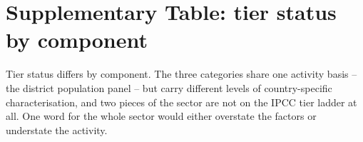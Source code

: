 \section{Supplementary Table: tier status by component}
\label{app:tiers}

Tier status differs by component. The three categories share one activity
basis -- the district population panel -- but carry different levels of
country-specific characterisation, and two pieces of the sector are not on
the IPCC tier ladder at all. One word for the whole sector would either
overstate the factors or understate the activity.

